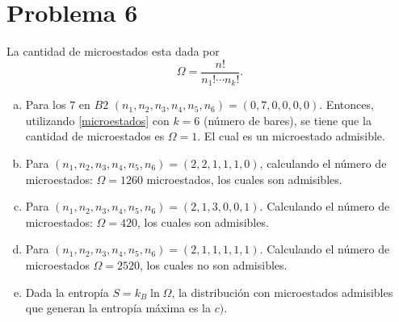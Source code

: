 \section{Problema 6}
La cantidad de microestados esta dada por
\begin{equation}
	\Omega = \frac{n!}{n_1 ! \cdots n_k !}. \label{microestados}
\end{equation}
\begin{enumerate}[a)]
	\item Para los $7$ en $B2$ $(n_1 ,n_2 ,n_3 ,n_4 ,n_5 ,n_6) = (0,7,0,0,0,0)$. Entonces, utilizando \eqref{microestados} con $k = 6$ (número de bares), se tiene que la cantidad de microestados es $\Omega = 1$. El cual es un microestado admisible.
	\item Para $(n_1 ,n_2 ,n_3 ,n_4 ,n_5 ,n_6) = (2,2,1,1,1,0)$, calculando el número de microestados: $\Omega = 1260$ microestados, los cuales son admisibles.
	\item Para $(n_1 ,n_2 ,n_3 ,n_4 ,n_5 ,n_6) = (2,1,3,0,0,1)$. Calculando el número de microestados: $\Omega = 420$, los cuales son admisibles.
	\item Para $(n_1 ,n_2 ,n_3 ,n_4 ,n_5 ,n_6) = (2,1,1,1,1,1)$. Calculando el número de microestados $\Omega = 2520$, los cuales no son admisibles.
	\item Dada la entropía $S = k_B \ln{\Omega}$, la distribución con microestados admisibles que generan la entropía máxima es la $c)$.
\end{enumerate}

























